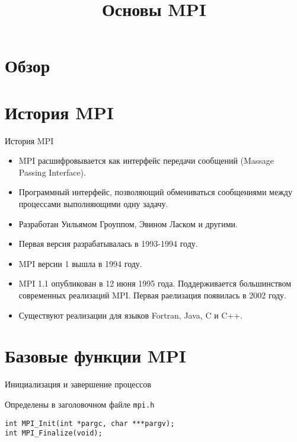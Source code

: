 

\title{Основы MPI}



\begin{frame}
\titlepage
\end{frame}

\section{Обзор}

\begin{frame}
\tableofcontents
\end{frame} 

\section{История MPI}

\begin{frame}{История MPI}

\begin{itemize}
    \item MPI расшифровывается как интерфейс передачи сообщений (\abbr Massage Passing Interface).
    \item Программный интерфейс, позволяющий обмениваться сообщениями между процессами выполняющими одну задачу.
    \item Разработан Уильямом Гроуппом, Эвином Ласком и другими.
    \item Первая версия разрабатывалась в 1993-1994 году.
    \item MPI версии 1 вышла в 1994 году.
    \item MPI 1.1 опубликован в 12 июня 1995 года. Поддерживается большинством современных реализаций MPI. Первая раелизация появилась в 2002 году.
    \item Существуют реализации для языков Fortran, Java, C и C++.
\end{itemize}

\end{frame}

\section{Базовые функции MPI}

\begin{frame}[fragile]{Инициализация и завершение процессов}

Определены в заголовочном файле \texttt{mpi.h}

\vfill

\begin{lstlisting}
int MPI_Init(int *pargc, char ***pargv);
int MPI_Finalize(void);
\end{lstlisting}

\end{frame}

